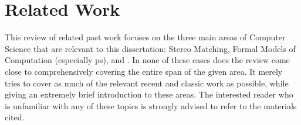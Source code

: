 \glsresetall

\chapter{Related Work}
This review of related past work focuses on the three main areas of Computer Science that are relevant to this dissertation:  Stereo Matching, Formal Models of Computation (especially \gls{ps}), and .  In none of these cases does the review come close to comprehensively covering the entire span of the given area.  It merely tries to cover as much of the relevant recent and classic work as possible, while giving an extremely brief introduction to these areas.  The interested reader who is unfamiliar with any of these topics is strongly advised to refer to the materials cited.








